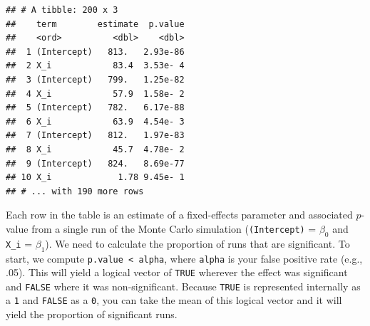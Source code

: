 \documentclass[
  english,
  doc,floatsintext]{apa6}
\newenvironment{Shaded}{\begin{snugshade}}{\end{snugshade}}
\newcommand{\CommentTok}[1]{\textcolor[rgb]{0.56,0.35,0.01}{\textit{#1}}}
\newcommand{\DataTypeTok}[1]{\textcolor[rgb]{0.13,0.29,0.53}{#1}}
\newcommand{\KeywordTok}[1]{\textcolor[rgb]{0.13,0.29,0.53}{\textbf{#1}}}
\newcommand{\NormalTok}[1]{#1}
\newcommand{\OperatorTok}[1]{\textcolor[rgb]{0.81,0.36,0.00}{\textbf{#1}}}
\newcommand{\OtherTok}[1]{\textcolor[rgb]{0.56,0.35,0.01}{#1}}
\newcommand{\StringTok}[1]{\textcolor[rgb]{0.31,0.60,0.02}{#1}}
\begin{document}
\begin{Shaded}
\end{Shaded}

\begin{verbatim}
## # A tibble: 200 x 3
##    term        estimate  p.value
##    <ord>          <dbl>    <dbl>
##  1 (Intercept)   813.   2.93e-86
##  2 X_i            83.4  3.53e- 4
##  3 (Intercept)   799.   1.25e-82
##  4 X_i            57.9  1.58e- 2
##  5 (Intercept)   782.   6.17e-88
##  6 X_i            63.9  4.54e- 3
##  7 (Intercept)   812.   1.97e-83
##  8 X_i            45.7  4.78e- 2
##  9 (Intercept)   824.   8.69e-77
## 10 X_i             1.78 9.45e- 1
## # ... with 190 more rows
\end{verbatim}

\noindent Each row in the table is an estimate of a fixed-effects parameter and associated \(p\)-value from a single run of the Monte Carlo simulation (\texttt{(Intercept)} = \(\beta_0\) and \texttt{X\_i} = \(\beta_1\)). We need to calculate the proportion of runs that are significant. To start, we compute \texttt{p.value\ \textless{}\ alpha}, where \texttt{alpha} is your false positive rate (e.g., .05). This will yield a logical vector of \texttt{TRUE} wherever the effect was significant and \texttt{FALSE} where it was non-significant. Because \texttt{TRUE} is represented internally as a \texttt{1} and \texttt{FALSE} as a \texttt{0}, you can take the mean of this logical vector and it will yield the proportion of significant runs.
\end{document}
